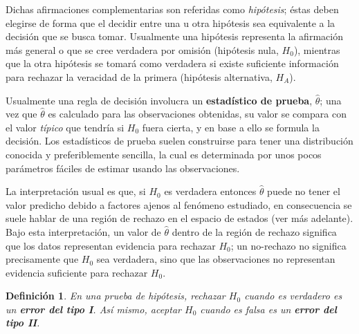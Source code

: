 \documentclass[12pt,letterpaper]{book}
\newtheorem{definicion}{Definición}[chapter]
\newcommand{\est}[1]{\widehat{ #1 }}
\begin{document}
Dichas afirmaciones complementarias son referidas como \textit{hipótesis}; éstas deben elegirse de forma que el decidir entre una u otra hipótesis sea equivalente a la decisión que se busca tomar. 
%
Usualmente una hipótesis representa la afirmación más general o que se cree verdadera por omisión (hipótesis nula, $H_0$), mientras que la otra hipótesis se tomará como verdadera si existe suficiente información para rechazar la veracidad de la primera (hipótesis alternativa, $H_A$).


Usualmente una regla de decisión involucra un \textbf{estadístico de prueba}, $\widehat{\theta}$; una vez que $\widehat{\theta}$ es calculado para las observaciones obtenidas, su valor se compara con el valor \textit{típico} que tendría si $H_0$ fuera cierta, y en base a ello se formula la decisión.
%
%
Los estadísticos de prueba suelen construirse para tener una distribución conocida y preferiblemente sencilla, la cual es determinada por unos pocos parámetros fáciles de estimar usando las observaciones.

La interpretación usual es que, si $H_0$ es verdadera entonces $\est{\theta}$ puede no tener el valor predicho debido a factores ajenos al fenómeno estudiado, en consecuencia se suele hablar de una región de rechazo en el espacio de estados (ver más adelante).
%
Bajo esta interpretación, un valor de $\widehat{\theta}$ dentro de la región de rechazo significa que los datos representan evidencia para rechazar $H_0$; un no-rechazo no significa precisamente que $H_0$ sea verdadera, sino que las observaciones no representan evidencia suficiente para rechazar $H_0$.

\begin{definicion}
En una prueba de hipótesis, rechazar $H_0$ cuando es verdadero es un \textbf{error del tipo I}. Así mismo, aceptar $H_0$ cuando es falsa es un \textbf{error del tipo II}.
\end{definicion}
\end{document}
